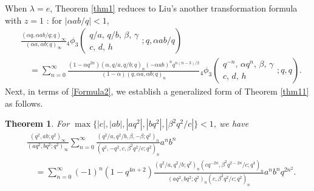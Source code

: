 \documentclass[reqno,12pt]{amsart}
\newtheorem{theorem}{Theorem}[section]%
\theoremstyle{remark}
\numberwithin{equation}{section}
\begin{document}
When $\lambda=e$,
Theorem \ref{thm1} reduces to Liu's
another transformation formula with $z=1$ \cite{Liu_1}: for $|\alpha ab/q|<1$,
\begin{align}
&\frac{\left(\alpha q,\alpha ab/q;q\right)_{\infty}}{\left(\alpha a,\alpha b;q\right)_{\infty}}
{_4\phi_3}\left(\begin{array}{cccc}
q/a,\,q/b,\,\beta,\,\gamma\\
c,\,d,\,h
\end{array}
;q,{\alpha ab}/{q}\right)\nonumber\\
&\quad=
\sum_{n=0}^{\infty}
\frac{\left(1-\alpha q^{2n}\right)\left(\alpha,q/a,q/b;q\right)_n\left(-\alpha ab\right)^nq^{{n\left(n-3\right)}/{2}}}
{\left(1-\alpha\right)\left(q,\alpha a,\alpha b;q\right)_n}
{_4\phi_3}\left(\begin{array}{cccc}
q^{-n},\,\alpha q^n,\,\beta,\,\gamma\\
c,\,d,\,h
\end{array}
;q,q\right).\label{Formula2}
\end{align}
Next, in terms of \eqref{Formula2}, we establish  a generalized form of Theorem \ref{thm11} as follows.
\begin{theorem}\label{T5}
For $\max\{|c|, |ab|,|aq^2|, |bq^2|,  |\beta^2q^2/c|\}<1$, we have
\begin{align*}
&\frac{\left(q^2,ab;q^2\right)_{\infty}}{\left(aq^2,bq^2;q^2\right)_{\infty}}
\sum_{n=0}^{\infty}\frac{\left(q^2/a,q^2/b,\beta,-\beta;q^2\right)_n}
{\left(q^2,-q^2,c,\beta^2q^2/c;q^2\right)_n}a^nb^n\\
&\quad=
\sum_{n=0}^{\infty}
\left(-1\right)^n\left(1-q^{4n+2}\right)
\frac{\left(q^2/a,q^2/b;q^2\right)_n
\left(cq^{-2n},\beta^2q^{2-2n}/c;q^4\right)_n}
{\left(aq^2,bq^2;q^2\right)_n\left(c,\beta^2q^2/c;q^2\right)_n}a^nb^nq^{2n^2}.
\end{align*}
\end{theorem}
\end{document}

